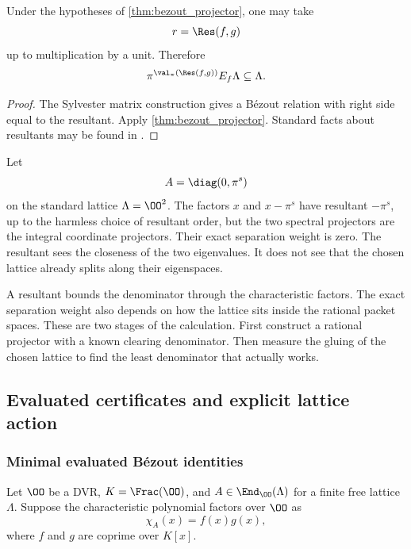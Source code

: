 \begin{corollary}\label{cor:resultant_bound}
Under the hypotheses of \cref{thm:bezout_projector}, one may take
\[
r=\Res(f,g)
\]
up to multiplication by a unit.  Therefore
\[
\pi^{\val_\pi(\Res(f,g))}E_f\Lambda\subseteq\Lambda.
\]
\end{corollary}

\begin{proof}
The Sylvester matrix construction gives a Bézout relation with right side equal to the resultant.  Apply \cref{thm:bezout_projector}.  Standard facts about resultants may be found in \cite{Lang2002,GohbergLancasterRodman2009}.
\end{proof}

\begin{example}\label{ex:loose_resultant}
Let
\[
A=\diag(0,\pi^s)
\]
on the standard lattice $\Lambda=\OO^2$.  The factors $x$ and $x-\pi^s$ have resultant $-\pi^s$, up to the harmless choice of resultant order, but the two spectral projectors are the integral coordinate projectors.  Their exact separation weight is zero.  The resultant sees the closeness of the two eigenvalues.  It does not see that the chosen lattice already splits along their eigenspaces.
\end{example}

\begin{interpretation}
A resultant bounds the denominator through the characteristic factors. The exact separation weight also depends on how the lattice sits inside the rational packet spaces. These are two stages of the calculation. First construct a rational projector with a known clearing denominator. Then measure the gluing of the chosen lattice to find the least denominator that actually works.
\end{interpretation}

\subsection{Evaluated certificates and explicit lattice action}

\subsubsection{Minimal evaluated B\'ezout identities}

Let $\OO$ be a DVR, $K=\Frac(\OO)$, and $A\in\End_\OO(\Lambda)$ for a finite free lattice $\Lambda$. Suppose the characteristic polynomial factors over $\OO$ as
\[
\chi_A(x)=f(x)g(x),
\]
where $f$ and $g$ are coprime over $K[x]$.

